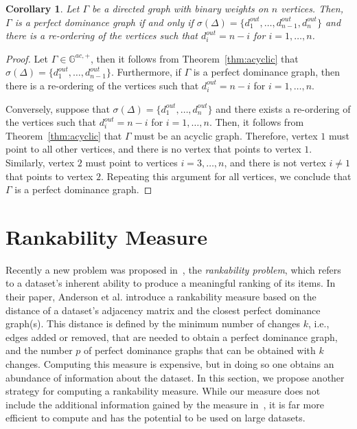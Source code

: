 \documentclass{article}
\newtheorem{corollary}[theorem]{Corollary}
\begin{document}
\begin{corollary}\label{cor:perf-dom}
Let $\Gamma$ be a directed graph with binary weights on $n$ vertices.
Then, $\Gamma$ is a perfect dominance graph if and only if $\sigma(\Delta)=\{d_{1}^{out},\ldots,d_{n-1}^{out},d_{n}^{out}\}$ and there is a re-ordering of the vertices such that $d_{i}^{out}=n-i$ for $i=1,\ldots,n$. 
\end{corollary}
\begin{proof}
Let $\Gamma\in\mathbb{G}^{ac,+}$, then it follows from Theorem~\ref{thm:acyclic} that $\sigma(\Delta)=\{d_{1}^{out},\ldots,d_{n-1}^{out}\}$.
Furthermore, if $\Gamma$ is a perfect dominance graph, then there is a re-ordering of the vertices such that $d_{i}^{out}=n-i$ for $i=1,\ldots,n$.

Conversely, suppose that $\sigma(\Delta)=\{d_{1}^{out},\ldots,d_{n}^{out}\}$ and there exists a re-ordering of the vertices such that $d_{i}^{out}=n-i$ for $i=1,\ldots,n$.
Then, it follows from Theorem~\ref{thm:acyclic} that $\Gamma$ must be an acyclic graph.
Therefore, vertex $1$ must point to all other vertices, and there is no vertex that points to vertex $1$. 
Similarly, vertex $2$ must point to vertices $i=3,\ldots,n$, and there is not vertex $i\neq 1$ that points to vertex $2$.
Repeating this argument for all vertices, we conclude that $\Gamma$ is a perfect dominance graph.
\end{proof}

\section{Rankability Measure}
Recently a new problem was proposed in~\cite{Anderson2018}, the \emph{rankability problem}, which refers to a dataset's inherent ability to produce a meaningful ranking of its items. 
In their paper, Anderson et al. introduce a rankability measure based on the distance of a dataset's adjacency matrix and the closest perfect dominance graph(s). 
This distance is defined by the minimum number of changes $k$, i.e., edges added or removed, that are needed to obtain a perfect dominance graph, and the number $p$ of perfect dominance graphs that can be obtained with $k$ changes.
Computing this measure is expensive, but in doing so one obtains an abundance of information about the dataset.
In this section, we propose another strategy for computing a rankability measure. 
While our measure does not include the additional information gained by the measure in~\cite{Anderson2018}, it is far more efficient to compute and has the potential to be used on large datasets.
\end{document}
